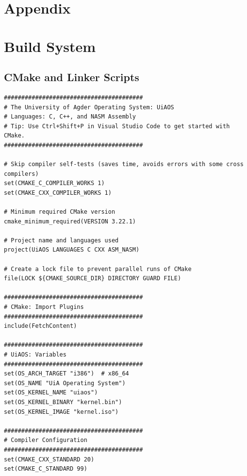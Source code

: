 \documentclass[../main.tex]{subfiles}
\begin{document}
\section{Appendix}
\label{sect:appendix}


\section{Build System}
\label{apx:build_system}


\subsection{CMake and Linker Scripts}
\label{apx:cmake_and_linker_scripts}


\label{lst:cmakelists_txt}
\begin{verbatim}
########################################
# The University of Agder Operating System: UiAOS
# Languages: C, C++, and NASM Assembly
# Tip: Use Ctrl+Shift+P in Visual Studio Code to get started with CMake.
########################################

# Skip compiler self-tests (saves time, avoids errors with some cross compilers)
set(CMAKE_C_COMPILER_WORKS 1)
set(CMAKE_CXX_COMPILER_WORKS 1)

# Minimum required CMake version
cmake_minimum_required(VERSION 3.22.1)

# Project name and languages used
project(UiAOS LANGUAGES C CXX ASM_NASM)

# Create a lock file to prevent parallel runs of CMake
file(LOCK ${CMAKE_SOURCE_DIR} DIRECTORY GUARD FILE)

########################################
# CMake: Import Plugins
########################################
include(FetchContent)

########################################
# UiAOS: Variables
########################################
set(OS_ARCH_TARGET "i386")  # x86_64 
set(OS_NAME "UiA Operating System")
set(OS_KERNEL_NAME "uiaos")
set(OS_KERNEL_BINARY "kernel.bin")
set(OS_KERNEL_IMAGE "kernel.iso")

########################################
# Compiler Configuration
########################################
set(CMAKE_CXX_STANDARD 20)
set(CMAKE_C_STANDARD 99)


\end{verbatim}
\end{document}
